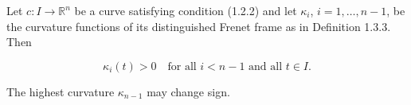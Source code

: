 Let $c: I \to \mathbb{R}^n$ be a curve satisfying condition (1.2.2) and let $\kappa_i$, $i = 1, \dots, n-1$, be the curvature functions of its distinguished Frenet frame as in Definition 1.3.3. Then

$$\kappa_i(t) > 0 \quad \text{for all } i < n - 1 \text{ and all } t \in I.$$

The highest curvature $\kappa_{n-1}$ may change sign.
